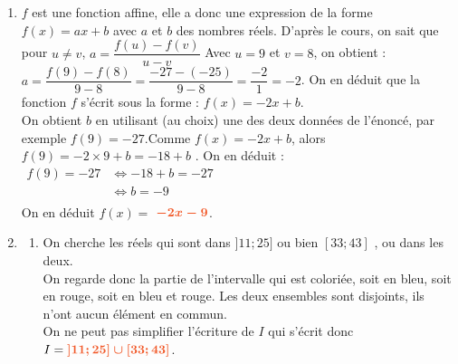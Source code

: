 \documentclass[a4paper,11pt]{article}
\begin{document}
\begin{seance}{} %
\begin{enumerate}
\item $f$ est une fonction affine, elle a donc une expression de la forme  $f(x)=ax+b$ avec $a$ et $b$ des nombres réels.
D'après le cours, on sait que pour $u\neq v$, $a=\dfrac{f(u)-f(v)}{u-v}$ Avec $u=9$ et  $v=8$, on obtient  :  $a=\dfrac{f(9)-f(8)}{9-8}=\dfrac{-27-(-25)}{9-8}=\dfrac{-2}{1}=-2$. On en déduit que la fonction $f$ s'écrit sous la forme :    $f(x)=-2 x +b.$\\On obtient $b$ en utilisant (au choix) une des deux données de l'énoncé, par exemple $f(9)=-27$.Comme $f(x)=-2x +b$, alors $f(9)=
              -2\times9+b=-18+b$ . On en déduit :\\$\begin{aligned}f(9)=-27&\iff -18+b=-27\\&\iff b=-9\\\end{aligned}$\\On en déduit $f(x)=$ ${\color[HTML]{f15929}\boldsymbol{-2x-9}}$.


\item 

\begin{enumerate}
\item On cherche les réels qui sont dans  $]11;25]$ ou bien  $[33;43]$ , ou dans les deux.\\On regarde donc la partie de l'intervalle qui est coloriée, soit en bleu, soit en rouge, soit en bleu et rouge.
Les deux ensembles sont disjoints, ils n'ont aucun élément en commun.\\
                    On ne peut pas simplifier l'écriture de $I$ qui s'écrit donc $I={\color[HTML]{f15929}\boldsymbol{]11;25]\cup[33;43]}}$.
\end{enumerate}
\end{enumerate}
\end{seance}
\end{document}
